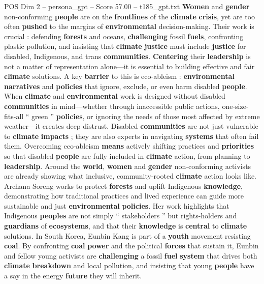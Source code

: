 \begin{textsample}{POS Dim 2 – persona\_gpt – Score 57.00 – t185\_gpt.txt}  \label{ex:f2_pos_018}
\textbf{Women} and \textbf{gender} non-conforming \textbf{people} are on the \textbf{frontlines} of the \textbf{climate} \textbf{crisis}, yet are too often \textbf{pushed} to the margins of \textbf{environmental} decision-making.
Their work is crucial : defending \textbf{forests} and oceans, \textbf{challenging} fossil \textbf{fuels}, confronting plastic pollution, and insisting that \textbf{climate} \textbf{justice} must include \textbf{justice} for disabled, Indigenous, and trans \textbf{communities}. \textbf{Centering} their \textbf{leadership} is not a matter of representation alone—it is essential to building effective and fair \textbf{climate} solutions.
A key \textbf{barrier} to this is eco-ableism : \textbf{environmental} \textbf{narratives} and \textbf{policies} that ignore, exclude, or even harm disabled \textbf{people}.
When \textbf{climate} and \textbf{environmental} work is designed without disabled \textbf{communities} in mind—whether through inaccessible public actions, one-size-fits-all “ green ” \textbf{policies}, or ignoring the needs of those most affected by extreme weather—it creates deep distrust.
Disabled \textbf{communities} are not just vulnerable to \textbf{climate} \textbf{impacts} ; they are also experts in navigating \textbf{systems} that often fail them.
Overcoming eco-ableism \textbf{means} actively shifting practices and \textbf{priorities} so that disabled \textbf{people} are fully included in \textbf{climate} action, from planning to \textbf{leadership}.
Around the \textbf{world}, \textbf{women} and \textbf{gender} non-conforming activists are already showing what inclusive, community-rooted \textbf{climate} action looks like.
Archana Soreng works to protect \textbf{forests} and uplift Indigenous \textbf{knowledge}, demonstrating how traditional practices and lived experience can guide more sustainable and just \textbf{environmental} \textbf{policies}.
Her work highlights that Indigenous \textbf{peoples} are not simply “ stakeholders ” but rights-holders and \textbf{guardians} of \textbf{ecosystems}, and that their \textbf{knowledge} is \textbf{central} to \textbf{climate} solutions.
In South Korea, Eunbin Kang is part of a \textbf{youth} movement resisting \textbf{coal}.
By confronting \textbf{coal} \textbf{power} and the political \textbf{forces} that sustain it, Eunbin and fellow young activists are \textbf{challenging} a fossil \textbf{fuel} \textbf{system} that drives both \textbf{climate} \textbf{breakdown} and local pollution, and insisting that young \textbf{people} have a say in the energy \textbf{future} they will inherit.

\end{textsample}
